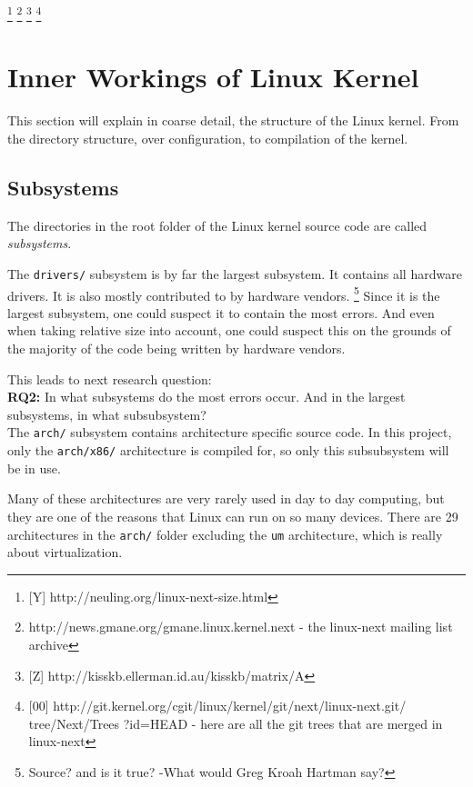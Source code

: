 \documentclass[a4paper,11pt]{report}
\newcommand{\textcode}[1]{
    \fboxsep=1pt
    \texttt{\colorbox{gray!20}{#1}}
}
\newcommand{\figa}{
    \begin{figure}[!htpb]
    \centering
}
\newcommand{\figb}[2]{
    \caption{#1}
    \label{#2}
    \end{figure}
}
\begin{document}
    \footnote{[Y] http://neuling.org/linux-next-size.html}
    \footnote{http://news.gmane.org/gmane.linux.kernel.next - the linux-next 
        mailing list archive}
    \footnote{[Z] http://kisskb.ellerman.id.au/kisskb/matrix/A}
    \footnote{ [00] 
        http://git.kernel.org/cgit/linux/kernel/git/next/linux-next.git/
        tree/Next/Trees ?id=HEAD - here are all the git trees that are merged 
        in linux-next}


        \section{Inner Workings of Linux Kernel}

This section will explain in coarse detail, the structure of the Linux kernel.
From the directory structure, over configuration, to compilation of the kernel.


        \subsection{Subsystems}

The directories in the root folder of the Linux kernel source code are called 
\emph{subsystems}. 


The \textcode{drivers/} subsystem is by far the largest subsystem. It contains 
all hardware drivers. It is also mostly contributed to by hardware vendors.
    \footnote{Source? and is it true? -What would Greg Kroah Hartman say?}
Since it is the largest subsystem, one could suspect it to contain the most 
errors. And even when taking relative size into account, one could suspect this
on the grounds of the majority of the code being written by hardware vendors.

This leads to next research question:
\\

\textbf{RQ2:} In what subsystems do the most errors occur. And in the largest 
subsystems, in what subsubsystem? 
\\


The \texttt{arch/} subsystem contains architecture specific source code. In 
this project, only the \texttt{arch/x86/} architecture is compiled for, so 
only this subsubsystem will be in use. 

Many of these architectures are very rarely used in day to day computing, but 
they are one of the reasons that Linux can run on so many devices. There are 29 
architectures in the \texttt{arch/} folder excluding the \texttt{um} 
architecture, which is really about virtualization.
\end{document}
